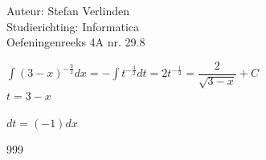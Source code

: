 \documentclass[a4paper]{article}
\begin{document}
  
\noindent \large Auteur: Stefan Verlinden \\
\noindent \large Studierichting: Informatica\\
\noindent \large Oefeningenreeks 4A nr. 29.8\\

\medskip

\normalsize

$\displaystyle\int (3-x)^{-\tfrac{3}{2}}dx = -\displaystyle\int t^{-\tfrac{3}{2}}dt 
= 2t^{-\tfrac{1}{2}} = \dfrac{2}{\sqrt{3-x}} + C$\\

$t=3-x$\

$dt=(-1)dx$

\begin{thebibliography}{999}
\end{thebibliography}
\end{document}

